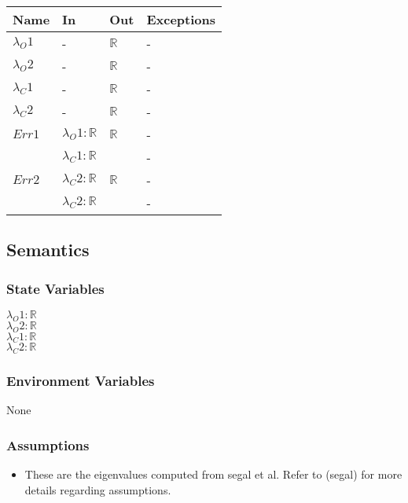 \documentclass[12pt, titlepage]{article}
\begin{document}
\begin{center}
	\begin{tabular}{p{3cm} p{6cm} p{3cm} >{\raggedright\arraybackslash}p{3cm}}
		\toprule
		\textbf{Name} & \textbf{In} & \textbf{Out} & \textbf{Exceptions} \\
		\hline
		$\lambda_O1$ & - & $\mathbb{R}$ & - \\
		$\lambda_O2$ & - & $\mathbb{R}$ & - \\ 
		$\lambda_C1$ & - & $\mathbb{R}$ & - \\
		$\lambda_C2$ & - & $\mathbb{R}$ & - \\
		$Err1$ & $\lambda_O1 : \mathbb{R}$ & $\mathbb{R}$ &- \\
		 & $\lambda_C1 : \mathbb{R}$ &  &- \\
		$Err2$ & $\lambda_C2 : \mathbb{R}$ & $\mathbb{R}$ &- \\
		 & $\lambda_C2 : \mathbb{R}$ &  &- \\
		\hline
	\end{tabular}
\end{center}

\subsection{Semantics}

\subsubsection{State Variables}

$\lambda_O1 : \mathbb{R}$ \\
$\lambda_O2 : \mathbb{R}$ \\
$\lambda_C1 : \mathbb{R}$ \\ 
$\lambda_C2 : \mathbb{R}$

\subsubsection{Environment Variables}

None

\subsubsection{Assumptions}

\begin{itemize}
	\item These are the eigenvalues computed from segal et al. Refer to (segal) 
	for more details regarding assumptions.
\end{itemize}
\end{document}
